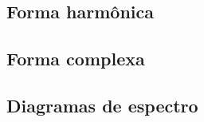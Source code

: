 \documentclass[a4paper,10pt]{book}
\newcommand{\sen}{\operatorname{sen}\,}
\begin{document}

\subsection{Forma harmônica}
\subsection{Forma complexa}
\subsection{Diagramas de espectro}
\end{document}
